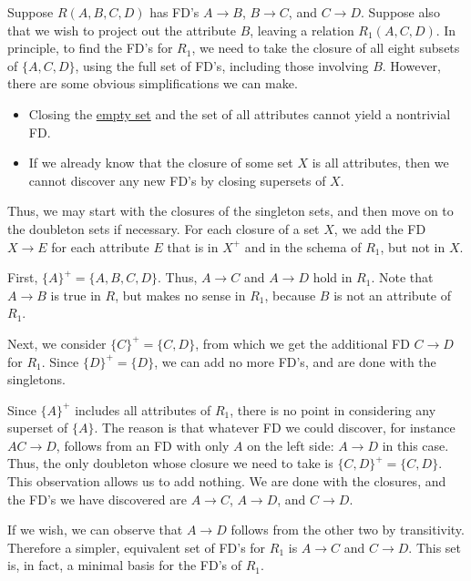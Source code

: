     \begin{example}
      \label{ex:computing-fds-for-projections}
      Suppose $R(A,B,C,D)$ has FD's $A \rightarrow B$, $B \rightarrow C$, and $C \rightarrow D$. Suppose also that we wish to project out the attribute $B$, leaving a relation $R_1(A,C,D)$. In principle, to find the FD's for $R_1$, we need to take the closure of all eight subsets of $\{A, C, D\}$, using the full set of FD's, including those involving $B$. However, there are some obvious simplifications we can make.

      \begin{itemize}
        \item Closing the \hyperref[st-def:empty-set]{empty set} and the set of all attributes cannot yield a nontrivial FD.
        \item If we already know that the closure of some set $X$ is all attributes, then we cannot discover any new FD's by closing supersets of $X$.
      \end{itemize}

      Thus, we may start with the closures of the singleton sets, and then move on to the doubleton sets if necessary. For each closure of a set $X$, we add the FD $X \rightarrow E$ for each attribute $E$ that is in $X^+$ and in the schema of $R_1$, but not in $X$.

      First, $\{A\}^+ = \{A,B,C,D\}$. Thus, $A \rightarrow C$ and $A \rightarrow D$ hold in $R_1$. Note that $A \rightarrow B$ is true in $R$, but makes no sense in $R_1$, because $B$ is not an attribute of $R_1$.

      Next, we consider $\{C\}^+ = \{C,D\}$, from which we get the additional FD $C \rightarrow D$ for $R_1$. Since $\{D\}^+ = \{D\}$, we can add no more FD's, and are done with the singletons.

      Since $\{A\}^+$ includes all attributes of $R_1$, there is no point in considering any superset of $\{A\}$. The reason is that whatever FD we could discover, for instance $AC \rightarrow D$, follows from an FD with only $A$ on the left side: $A \rightarrow D$ in this case. Thus, the only doubleton whose closure we need to take is $\{C, D\}^+ = \{C,D\}$. This observation allows us to add nothing. We are done with the closures, and the FD's we have discovered are $A \rightarrow C$, $A \rightarrow D$, and $C \rightarrow D$.

      If we wish, we can observe that $A \rightarrow D$ follows from the other two by transitivity. Therefore a simpler, equivalent set of FD's for $R_1$ is $A \rightarrow C$ and $C \rightarrow D$. This set is, in fact, a minimal basis for the FD's of $R_1$. 
    \end{example}

